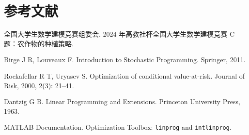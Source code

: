 \section{参考文献}

\begin{enumerate}[label={[\arabic*]}]
  \item 全国大学生数学建模竞赛组委会. 2024 年高教社杯全国大学生数学建模竞赛 C 题：农作物的种植策略.
  \item Birge J R, Louveaux F. Introduction to Stochastic Programming. Springer, 2011.
  \item Rockafellar R T, Uryasev S. Optimization of conditional value-at-risk. Journal of Risk, 2000, 2(3): 21--41.
  \item Dantzig G B. Linear Programming and Extensions. Princeton University Press, 1963.
  \item MATLAB Documentation. Optimization Toolbox: \texttt{linprog} and \texttt{intlinprog}.
\end{enumerate}
